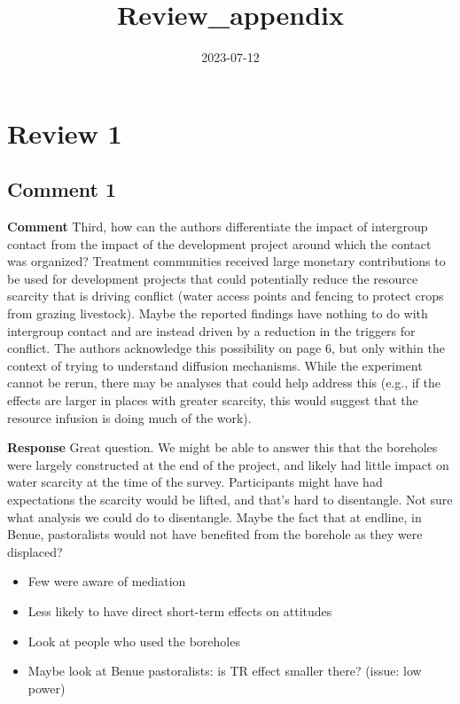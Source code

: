 \documentclass[
]{article}
\title{Review\_appendix}
\author{}
\date{\vspace{-2.5em}2023-07-12}
\providecommand{\tightlist}{%
  \setlength{\itemsep}{0pt}\setlength{\parskip}{0pt}}
\begin{document}
\maketitle

{
\setcounter{tocdepth}{2}
\tableofcontents
}
\hypertarget{review-1}{%
\section{Review 1}\label{review-1}}

\hypertarget{comment-1}{%
\subsection{Comment 1}\label{comment-1}}

\textbf{Comment} Third, how can the authors differentiate the impact of
intergroup contact from the impact of the development project around
which the contact was organized? Treatment communities received large
monetary contributions to be used for development projects that could
potentially reduce the resource scarcity that is driving conflict (water
access points and fencing to protect crops from grazing livestock).
Maybe the reported findings have nothing to do with intergroup contact
and are instead driven by a reduction in the triggers for conflict. The
authors acknowledge this possibility on page 6, but only within the
context of trying to understand diffusion mechanisms. While the
experiment cannot be rerun, there may be analyses that could help
address this (e.g., if the effects are larger in places with greater
scarcity, this would suggest that the resource infusion is doing much of
the work).

\textbf{Response} Great question. We might be able to answer this that
the boreholes were largely constructed at the end of the project, and
likely had little impact on water scarcity at the time of the survey.
Participants might have had expectations the scarcity would be lifted,
and that's hard to disentangle. Not sure what analysis we could do to
disentangle. Maybe the fact that at endline, in Benue, pastoralists
would not have benefited from the borehole as they were displaced?

\begin{itemize}
\tightlist
\item
  Few were aware of mediation
\item
  Less likely to have direct short-term effects on attitudes
\item
  Look at people who used the boreholes
\item
  Maybe look at Benue pastoralists: is TR effect smaller there? (issue:
  low power)
\end{itemize}
\end{document}
